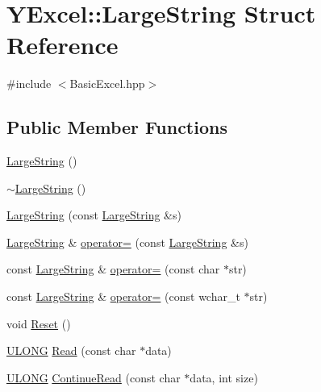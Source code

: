 \hypertarget{struct_y_excel_1_1_large_string}{}\section{Y\+Excel\+:\+:Large\+String Struct Reference}
\label{struct_y_excel_1_1_large_string}


{\ttfamily \#include $<$Basic\+Excel.\+hpp$>$}

\subsection*{Public Member Functions}
\begin{DoxyCompactItemize}
\item 
\hyperlink{struct_y_excel_1_1_large_string_a8020faa48b2977504d1a5f80637d6fea}{Large\+String} ()
\item 
\hyperlink{struct_y_excel_1_1_large_string_a53e799a2dc1a4572868b7dc86b45c7f0}{$\sim$\+Large\+String} ()
\item 
\hyperlink{struct_y_excel_1_1_large_string_a11e79354ea7627ff1b9664f2c9d2e7f4}{Large\+String} (const \hyperlink{struct_y_excel_1_1_large_string}{Large\+String} \&s)
\item 
\hyperlink{struct_y_excel_1_1_large_string}{Large\+String} \& \hyperlink{struct_y_excel_1_1_large_string_a156d4b061bc3ba436fda0b2116ab7f19}{operator=} (const \hyperlink{struct_y_excel_1_1_large_string}{Large\+String} \&s)
\item 
const \hyperlink{struct_y_excel_1_1_large_string}{Large\+String} \& \hyperlink{struct_y_excel_1_1_large_string_ae67de42decf677aeaf7b8b1768fc8f00}{operator=} (const char $\ast$str)
\item 
const \hyperlink{struct_y_excel_1_1_large_string}{Large\+String} \& \hyperlink{struct_y_excel_1_1_large_string_a153fc13a66f61c3380f9acef892fa693}{operator=} (const wchar\+\_\+t $\ast$str)
\item 
void \hyperlink{struct_y_excel_1_1_large_string_abf0c63f8ce9aa109a2f5acf9c3b991d7}{Reset} ()
\item 
\hyperlink{_basic_excel_8hpp_abe09d1bea023be6a07cbadde8e955435}{U\+L\+O\+N\+G} \hyperlink{struct_y_excel_1_1_large_string_a6f180b65063bfd33b6132d3402d22411}{Read} (const char $\ast$data)
\item 
\hyperlink{_basic_excel_8hpp_abe09d1bea023be6a07cbadde8e955435}{U\+L\+O\+N\+G} \hyperlink{struct_y_excel_1_1_large_string_a1f3446cdbfaeb247b7c73d01085876a2}{Continue\+Read} (const char $\ast$data, int size)

\end{DoxyCompactItemize}
